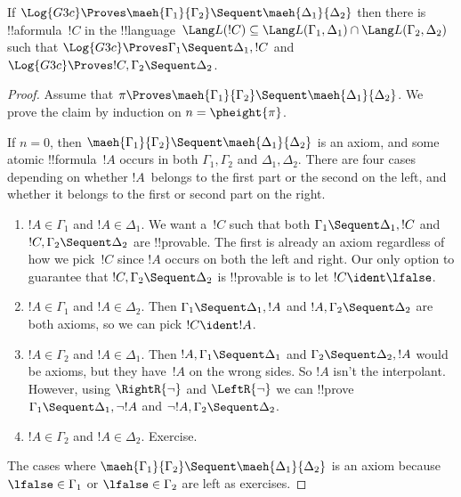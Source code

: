 \documentclass[../../../include/open-logic-section]{subfiles}
\begin{document}
\begin{lem} If $\Log{G3c}
\Proves \maeh{\Gamma_1}{\Gamma_2} \Sequent \maeh{\Delta_1}{\Delta_2}$
then there is !!a{formula}~$!C$ in the !!{language}~$\Lang L(!C)
\subseteq \Lang L(\Gamma_1,
\Delta_1) \cap \Lang L(\Gamma_2, \Delta_2)$ such that $\Log{G3c}
\Proves \Gamma_1 \Sequent \Delta_1, !C$ and $\Log{G3c} \Proves !C,
\Gamma_2 \Sequent \Delta_2$.
\end{lem}

\begin{proof}
  Assume that $\pi \Proves \maeh{\Gamma_1}{\Gamma_2} \Sequent
  \maeh{\Delta_1}{\Delta_2}$. We prove the claim by induction on
  $n=\pheight{\pi}$.

  If $n=0$, then $\maeh{\Gamma_1}{\Gamma_2} \Sequent
  \maeh{\Delta_1}{\Delta_2}$ is an axiom, and some atomic
  !!{formula}~$!A$ occurs in both $\Gamma_1, \Gamma_2$ and $\Delta_1,
  \Delta_2$. There are four cases depending on whether $!A$~belongs to
  the first part or the second on the left, and whether it belongs to
  the first or second part on the right.
  \begin{enumerate}
    \item $!A \in \Gamma_1$ and $!A \in \Delta_1$. We want a~$!C$ such
    that both $\Gamma_1 \Sequent \Delta_1, !C$ and $!C, \Gamma_2
    \Sequent \Delta_2$ are !!{provable}. The first is already an axiom
    regardless of how we pick~$!C$ since $!A$ occurs on both the left
    and right. Our only option to guarantee that $!C, \Gamma_2
    \Sequent \Delta_2$ is !!{provable} is to let $!C \ident \lfalse$.
    \item $!A \in \Gamma_1$ and $!A \in \Delta_2$. Then $\Gamma_1
    \Sequent \Delta_1, !A$ and $!A, \Gamma_2 \Sequent \Delta_2$ are
    both axioms, so we can pick $!C \ident !A$.
    \item $!A \in \Gamma_2$ and $!A \in \Delta_1$. Then $!A, \Gamma_1
    \Sequent \Delta_1$ and $\Gamma_2 \Sequent \Delta_2, !A$ would be 
    axioms, but they have~$!A$ on the wrong sides. So $!A$ isn't the
    interpolant. However, using $\RightR{\lnot}$ and $\LeftR{\lnot}$
    we can !!{prove} $\Gamma_1
    \Sequent \Delta_1, \lnot!A$ and $\lnot !A, \Gamma_2 \Sequent
    \Delta_2$.
    \item $!A \in \Gamma_2$ and $!A \in \Delta_2$. Exercise.
  \end{enumerate}
  The cases where $\maeh{\Gamma_1}{\Gamma_2} \Sequent
  \maeh{\Delta_1}{\Delta_2}$ is an axiom because $\lfalse \in
  \Gamma_1$ or $\lfalse \in \Gamma_2$ are left as exercises.


\end{proof}
\end{document}
